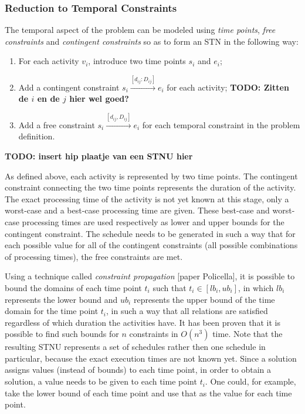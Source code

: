 \documentclass{article}
\newcommand{\TODO}[1]{{\color{red}\textbf{TODO: #1}}}
\begin{document}
\subsubsection{Reduction to Temporal Constraints}
The temporal aspect of the problem can be modeled using \emph{time points}, \emph{free constraints} and \emph{contingent constraints} so as to form an STN in the following way:
\begin{enumerate}
\item For each activity $v_i$, introduce two time points $s_i$ and $e_i$;
\item Add a contingent constraint $s_i \xrightarrow{[d_{ij}:D_{ij}]} e_i$ for each activity; \TODO{Zitten de $i$ en de $j$ hier wel goed?}
\item Add a free constraint $s_i \xrightarrow{[d_{ij},D_{ij}]} e_i$ for each temporal constraint in the problem definition.
\end{enumerate}

\TODO{insert hip plaatje van een STNU hier}

As defined above, each activity is represented by two time points. The contingent constraint connecting the two time points represents the duration of the activity. The exact processing time of the activity is not yet known at this stage, only a worst-case and a best-case processing time are given. These best-case and worst-case processing times are used respectively as lower and upper bounds for the contingent constraint. The schedule needs to be generated in such a way that for each possible value for all of the contingent constraints (all possible combinations of processing times), the free constraints are met.

Using a technique called \emph{constraint propagation} [paper Policella], it is possible to bound the domains of each time point $t_i$ such that $t_i \in [lb_i, ub_i]$, in which $lb_i$ represents the lower bound and $ub_i$ represents the upper bound of the time domain for the time point $t_i$, in such a way that all relations are satisfied regardless of which duration the activities have. It has been proven that it is possible to find such bounds for $n$ constraints in $O(n^3)$ time. Note that the resulting STNU represents a set of schedules rather then one schedule in particular, because the exact execution times are not known yet. Since a solution assigns values (instead of bounds) to each time point, in order to obtain a solution, a value needs to be given to each time point $t_i$. One could, for example, take the lower bound of each time point and use that as the value for each time point.
\end{document}
